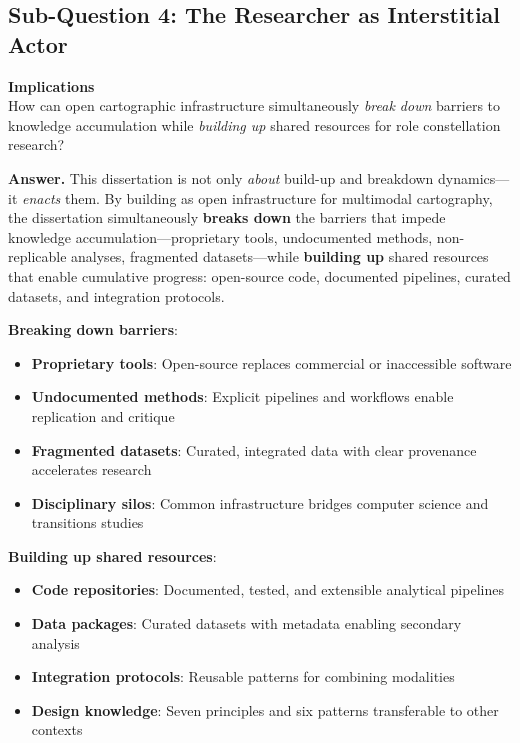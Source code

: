\documentclass[../main.tex]{subfiles}
\begin{document}
\subsection{Sub-Question 4: The Researcher as Interstitial Actor}

\begin{subrq}
\textbf{Implications}\\
How can open cartographic infrastructure simultaneously \emph{break down} barriers to knowledge accumulation while \emph{building up} shared resources for role constellation research?
\end{subrq}

\noindent\textbf{Answer.} This dissertation is not only \emph{about} build-up and breakdown dynamics---it \emph{enacts} them. By building \RoleBox{} as open infrastructure for multimodal cartography, the dissertation simultaneously \textbf{breaks down} the barriers that impede knowledge accumulation---proprietary tools, undocumented methods, non-replicable analyses, fragmented datasets---while \textbf{building up} shared resources that enable cumulative progress: open-source code, documented pipelines, curated datasets, and integration protocols.

\textbf{Breaking down barriers}:
\begin{itemize}[leftmargin=*, itemsep=0.2em]
\item \textbf{Proprietary tools}: Open-source \RoleBox{} replaces commercial or inaccessible software
\item \textbf{Undocumented methods}: Explicit pipelines and workflows enable replication and critique
\item \textbf{Fragmented datasets}: Curated, integrated data with clear provenance accelerates research
\item \textbf{Disciplinary silos}: Common infrastructure bridges computer science and transitions studies
\end{itemize}

\textbf{Building up shared resources}:
\begin{itemize}[leftmargin=*, itemsep=0.2em]
\item \textbf{Code repositories}: Documented, tested, and extensible analytical pipelines
\item \textbf{Data packages}: Curated datasets with metadata enabling secondary analysis
\item \textbf{Integration protocols}: Reusable patterns for combining modalities
\item \textbf{Design knowledge}: Seven principles and six patterns transferable to other contexts
\end{itemize}
\end{document}
